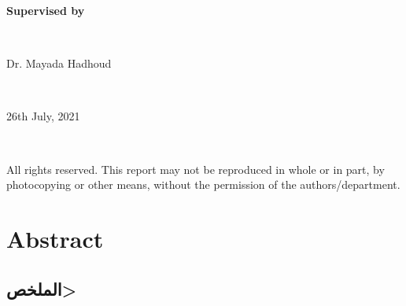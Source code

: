 \documentclass[a4paper,12pt]{article}
\begin{document}
\begin{titlepage}
\begin{minipage}{\textwidth}
\begin{center}
\textbf{\Large Supervised by}
\end{center} 
\end{minipage} \\[0.5cm]

\begin{minipage}{0.45\textwidth}
\begin{center} 
Dr. Mayada Hadhoud
\end{center}
\end{minipage} \\[1cm]

\begin{minipage}{0.45\textwidth}
\begin{center} 
26th July, 2021
\end{center}
\end{minipage} \\[0.5cm]

\begin{minipage}{\textwidth}
\begin{center} 
\small All rights reserved. This report may not be reproduced in whole or in part, by photocopying or other means, without the permission of the authors/department.
\end{center}
\end{minipage}

\end{titlepage}


\section*{Abstract}


\newpage

\begin{minipage}{\textwidth}
\begin{flushright}
\section*{\<الملخص>}

\end{flushright}
\end{minipage}
\end{document}
